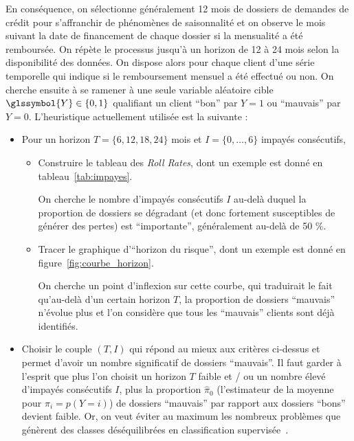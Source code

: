 En conséquence, on sélectionne généralement 12 mois de dossiers de demandes de crédit pour s'affranchir de phénomènes de saisonnalité et on observe le mois suivant la date de financement de chaque dossier si la mensualité a été remboursée. On répète le processus jusqu'à un horizon de 12 à 24 mois selon la disponibilité des données. On dispose alors pour chaque client d'une série temporelle qui indique si le remboursement mensuel a été effectué ou non. On cherche ensuite à se ramener à une seule variable aléatoire cible $\glssymbol{Y} \in \{0,1\}$ qualifiant un client ``bon'' par $Y=1$ ou ``mauvais'' par $Y=0$. L'heuristique actuellement utilisée est la suivante :
\begin{itemize}
\item Pour un horizon $T=\{6,12,18,24\}$ mois et $I = \{0,\dots,6\}$ impayés consécutifs,
\begin{itemize}
\item Construire le tableau des \textit{Roll Rates}, dont un exemple est donné en tableau~\ref{tab:impayes}.

On cherche le nombre d'impayés consécutifs $I$ au-delà duquel la proportion de dossiers se dégradant (et donc fortement susceptibles de générer des pertes) est ``importante'', généralement au-delà de 50 \%. 
\item Tracer le graphique d'``horizon du risque'', dont un exemple est donné en figure~\ref{fig:courbe_horizon}.

On cherche un point d'inflexion sur cette courbe, qui traduirait le fait qu'au-delà d'un certain horizon $T$, la proportion de dossiers ``mauvais'' n'évolue plus et l'on considère que tous les ``mauvais'' clients sont déjà identifiés.
\end{itemize}
\item Choisir le couple $(T,I)$ qui répond au mieux aux critères ci-dessus et permet d'avoir un nombre significatif de dossiers ``mauvais''. Il faut garder à l'esprit que plus l'on choisit un horizon $T$ faible et / ou un nombre élevé d'impayés consécutifs $I$, plus la proportion $\hat{\pi}_0$ (l'estimateur de la moyenne pour $\pi_i = p(Y=i)$) de dossiers ``mauvais'' par rapport aux dossiers ``bons'' devient faible.
Or, on veut éviter au maximum les nombreux problèmes que génèrent des classes déséquilibrées en classification supervisée~\cite{sun2009classification}.
\end{itemize}

